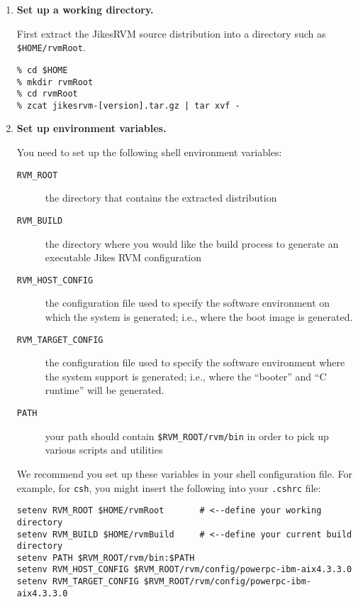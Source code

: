 \begin{enumerate}
\item {\bf Set up a working directory.}

First extract the Jikes\trademark RVM source distribution into a
directory such as  
{\tt \$HOME/rvmRoot}.
\begin{verbatim}
% cd $HOME
% mkdir rvmRoot
% cd rvmRoot
% zcat jikesrvm-[version].tar.gz | tar xvf - 
\end{verbatim}

\item {\bf Set up environment variables.}

You need to set up the following shell environment variables:

\begin{description}
\item [{\tt RVM\_ROOT}] the directory that contains the extracted
distribution 
\item [{\tt RVM\_BUILD}] the directory where you would like the build
process to generate an executable Jikes RVM configuration

\item [{\tt RVM\_HOST\_CONFIG}] the configuration file used to specify
the software environment on which the system is generated; i.e., where the
boot image is generated.

\item [{\tt RVM\_TARGET\_CONFIG}] the configuration file used to specify
the software environment where the system support is generated; i.e., where
the ``booter'' and ``C runtime'' will be generated.

\item[{\tt PATH}] your path should contain {\tt \$RVM\_ROOT/rvm/bin} in
order to pick up various scripts and utilities
\end{description}

We recommend you set up these variables in your shell configuration
file.  For example, for {\tt csh}, you might insert the
following into your {\tt .cshrc} file:

\begin{verbatim}
setenv RVM_ROOT $HOME/rvmRoot       # <--define your working directory 
setenv RVM_BUILD $HOME/rvmBuild     # <--define your current build directory 
setenv PATH $RVM_ROOT/rvm/bin:$PATH
setenv RVM_HOST_CONFIG $RVM_ROOT/rvm/config/powerpc-ibm-aix4.3.3.0
setenv RVM_TARGET_CONFIG $RVM_ROOT/rvm/config/powerpc-ibm-aix4.3.3.0
\end{verbatim}


\end{enumerate}

